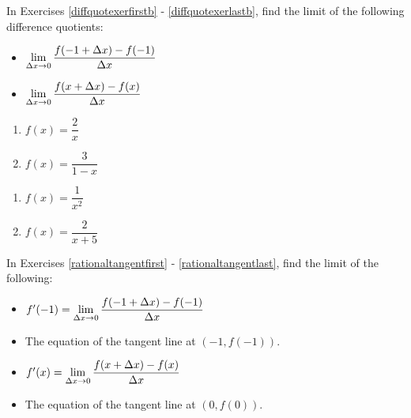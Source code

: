 \documentclass{ximera}
\begin{document}
In Exercises \ref{diffquotexerfirstb} - \ref{diffquotexerlastb}, find the limit of the following difference quotients:

\begin{multicols}{2}

\begin{itemize}

\item  $\ds{\lim_{\Delta x \rightarrow 0} \dfrac{f(-1+\Delta x) - f(-1)}{\Delta x}}$

\item  $\ds{\lim_{\Delta x \rightarrow 0} \dfrac{f(x+\Delta x) - f(x)}{\Delta x}}$

\end{itemize}

\end{multicols}

\begin{multicols}{2}
\begin{enumerate}
\setcounter{enumi}{\value{HW}}

\item $f(x) = \dfrac{2}{x}$  \label{diffquotexerfirstb}
\item $f(x) = \dfrac{3}{1-x}$

\setcounter{HW}{\value{enumi}}
\end{enumerate}
\end{multicols}

\begin{multicols}{2}
\begin{enumerate}
\setcounter{enumi}{\value{HW}}

\item  $f(x) = \dfrac{1}{x^2}$
\item\label{diffquotexerlastb}  $f(x) = \dfrac{2}{x+5}$

\setcounter{HW}{\value{enumi}}
\end{enumerate}
\end{multicols}

In Exercises \ref{rationaltangentfirst} - \ref{rationaltangentlast}, find the limit of the following:



\begin{itemize}

\item  $f'(-1) = \ds{\lim_{\Delta x \rightarrow 0} \dfrac{f(-1+\Delta x) - f(-1)}{\Delta x}}$

\item The equation of the tangent line at $(-1, f(-1))$.

\item  $f'(x) = \ds{\lim_{\Delta x \rightarrow 0} \dfrac{f(x+\Delta x) - f(x)}{\Delta x}}$

\item  The equation of the tangent line at $(0,f(0))$.

\end{itemize}
\end{document}

